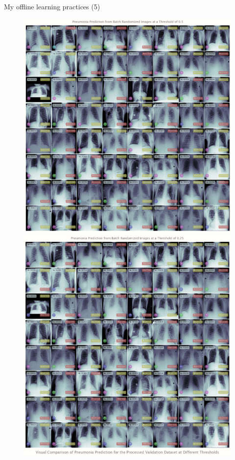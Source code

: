 \documentclass{beamer}
\begin{document}
\begin{frame}[fragile]{My offline learning practices (5)}
	\begin{figure}[!htb]
		\vspace{-.25em}
		\centering\includegraphics[width=\linewidth]{images/deep_learning_5_1_1.png}
		\endminipage\hfill
		\centering\includegraphics[width=\linewidth]{images/deep_learning_5_1_2.png}

\end{figure}
\end{frame}
\end{document}
